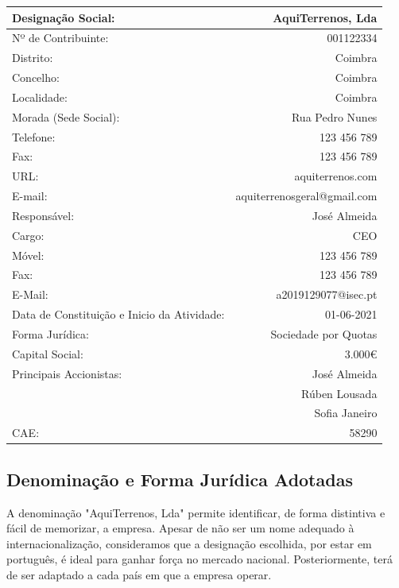 \documentclass[11pt]{article}
\begin{document}
	\begin{center}
		\begin{tabular}{ | l | r | }
			\hline
			Designação Social: & AquiTerrenos, Lda \\
			\hline
			Nº de Contribuinte: & 001122334 \\
			\hline 
			Distrito: & Coimbra \\
			\hline   
			Concelho: & Coimbra \\
			\hline   
			Localidade: & Coimbra \\
			\hline   
			Morada (Sede Social): & Rua Pedro Nunes \\
			\hline   
			Telefone: & 123 456 789 \\
			\hline 
			Fax: & 123 456 789 \\
			\hline 
			URL: & aquiterrenos.com \\
			\hline
			E-mail: & aquiterrenosgeral@gmail.com \\
			\hline 
			Responsável: & José Almeida \\
			\hline 
			Cargo: & CEO \\ 
			\hline
			Móvel: & 123 456 789 \\
			\hline 
			Fax: & 123 456 789 \\
			\hline 
			E-Mail: & a2019129077@isec.pt \\
			\hline 
			Data de Constituição e Inicio da Atividade: & 01-06-2021 \\
			\hline 
			Forma Jurídica: & Sociedade por Quotas \\
			\hline 
			Capital Social: & 3.000€ \\
			\hline
			Principais Accionistas: & José Almeida \\
			& Rúben Lousada  \\
			& Sofia Janeiro  \\
			\hline 
			CAE:  & 58290 \\
			\hline 
		\end{tabular}
	\end{center}

	\large
	\subsection{Denominação e Forma Jurídica Adotadas}
	
	\normalsize
	
	A denominação "AquiTerrenos, Lda" permite identificar, de forma distintiva e fácil de memorizar, a empresa. Apesar de não ser um nome adequado à internacionalização, consideramos que a designação escolhida, por estar em português, é ideal para ganhar força no mercado nacional. Posteriormente, terá de ser adaptado a cada país em que a empresa operar.
	
\end{document}
